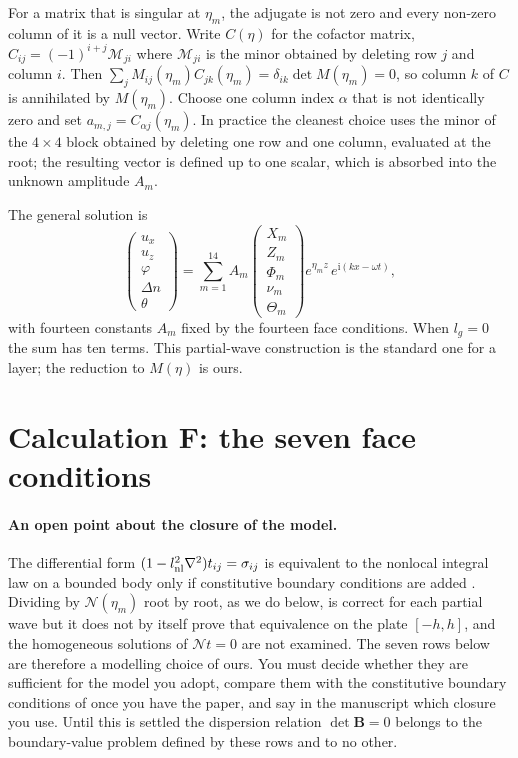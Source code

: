 \documentclass[11pt]{article}
\makeatletter
\newif\ifshowworked
\newenvironment{worked}{%
  \ifshowworked\par\smallskip\noindent\textit{Working.}\par\smallskip\else
  \setbox\z@\vbox\bgroup\fi}{\ifshowworked\par\smallskip\else\egroup\fi}
\newcommand{\ii}{\mathrm{i}}
\newcommand{\Ncal}{\mathcal{N}}
\makeatother
\begin{document}
\begin{worked}
For a matrix that is singular at $\eta_m$, the adjugate is not zero and every non-zero column of it is a
null vector. Write $C(\eta)$ for the cofactor matrix, $C_{ij}=(-1)^{i+j}\mathcal{M}_{ji}$ where
$\mathcal M_{ji}$ is the minor obtained by deleting row $j$ and column $i$. Then
$\sum_j M_{ij}(\eta_m)C_{jk}(\eta_m)=\delta_{ik}\det M(\eta_m)=0$, so column $k$ of $C$ is annihilated
by $M(\eta_m)$. Choose one column index $\alpha$ that is not identically zero and set
$a_{m,j}=C_{\alpha j}(\eta_m)$.
In practice the cleanest choice uses the minor of the $4\times4$ block obtained by deleting one row and
one column, evaluated at the root; the resulting vector is defined up to one scalar, which is absorbed into
the unknown amplitude $A_m$.
\end{worked}

The general solution is
\begin{equation}
\begin{pmatrix}u_x\\u_z\\\varphi\\\Delta n\\\theta\end{pmatrix}
=\sum_{m=1}^{14}A_m
\begin{pmatrix}X_m\\Z_m\\\Phi_m\\\nu_m\\\Theta_m\end{pmatrix}
e^{\eta_m z}\,e^{\ii(kx-\omega t)},
\label{eq:solution}
\end{equation}
with fourteen constants $A_m$ fixed by the fourteen face conditions. When $l_g=0$ the sum has ten terms.
This partial-wave construction is the standard one for a layer; the reduction to $M(\eta)$ is ours.

\section{Calculation F: the seven face conditions}\label{sec:calcF}

\paragraph{An open point about the closure of the model.} The differential form $(1-l_{\rm nl}^2\nabla^2)t_{ij}=\sigma_{ij}$ is equivalent to the nonlocal integral law on a bounded body only if constitutive boundary conditions are added \cite{Barretta2018}. Dividing by $\Ncal(\eta_m)$ root by root, as we do below, is correct for each partial wave but it does not by itself prove that equivalence on the plate $[-h,h]$, and the homogeneous solutions of $\Ncal t=0$ are not examined. The seven rows below are therefore a modelling choice of ours. You must decide whether they are sufficient for the model you adopt, compare them with the constitutive boundary conditions of \cite{Lim2015} once you have the paper, and say in the manuscript which closure you use. Until this is settled the dispersion relation $\det\mathbf B=0$ belongs to the boundary-value problem defined by these rows and to no other.
\end{document}
